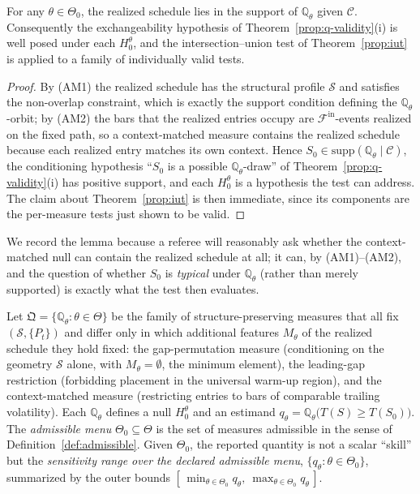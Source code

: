 \documentclass[risks,article,submit,pdftex,oneauthor]{Definitions/mdpi}
\begin{document}
\begin{Lemma}
\label{lem:admissible-validity}
For any $\theta\in\Theta_0$, the realized schedule lies in the support of
$\mathbb{Q}_\theta$ given $\mathcal C$. Consequently the exchangeability hypothesis
of Theorem~\ref{prop:q-validity}(i) is well posed under each $H_0^\theta$, and the
intersection--union test of Theorem~\ref{prop:iut} is applied to a family of
individually valid tests.
\end{Lemma}

\begin{proof}
By (AM1) the realized schedule has the structural profile $\mathcal S$ and satisfies
the non-overlap constraint, which is exactly the support condition defining the
$\mathbb{Q}_\theta$-orbit; by (AM2) the bars that the realized entries occupy are
$\mathcal F^{\mathrm{in}}$-events realized on the fixed path, so a context-matched
measure contains the realized schedule because each realized entry matches its own
context. Hence $S_0\in\mathrm{supp}(\mathbb{Q}_\theta\mid\mathcal C)$, the
conditioning hypothesis ``$S_0$ is a possible $\mathbb{Q}_\theta$-draw'' of
Theorem~\ref{prop:q-validity}(i) has positive support, and each $H_0^\theta$ is a
hypothesis the test can address. The claim about Theorem~\ref{prop:iut} is then
immediate, since its components are the per-measure tests just shown to be valid.
\end{proof}

We record the lemma because a referee will reasonably ask whether the
context-matched null can contain the realized schedule at all; it can, by (AM1)--(AM2),
and the question of whether $S_0$ is \emph{typical} under $\mathbb{Q}_\theta$ (rather
than merely supported) is exactly what the test then evaluates.

\begin{Definition}
\label{def:measure-family}
Let $\mathfrak Q=\{\mathbb{Q}_\theta:\theta\in\Theta\}$ be the family of
structure-preserving measures that all fix $(\mathcal S,\{P_t\})$ and differ only
in which additional features $M_\theta$ of the realized schedule they hold fixed:
the gap-permutation measure (conditioning on the geometry $\mathcal S$ alone, with
$M_\theta=\emptyset$, the minimum element), the leading-gap restriction (forbidding
placement in the universal warm-up region), and the context-matched measure
(restricting entries to bars of comparable trailing volatility). Each
$\mathbb{Q}_\theta$ defines a null $H_0^\theta$ and an estimand
$q_\theta=\mathbb{Q}_\theta\big(T(S)\ge T(S_0)\big)$. The \emph{admissible menu}
$\Theta_0\subseteq\Theta$ is the set of measures admissible in the sense of
Definition~\ref{def:admissible}. Given $\Theta_0$, the reported quantity is not a
scalar ``skill'' but the \emph{sensitivity range over the declared admissible
menu}, $\{q_\theta:\theta\in\Theta_0\}$, summarized by the outer bounds
$[\,\min_{\theta\in\Theta_0}q_\theta,\ \max_{\theta\in\Theta_0}q_\theta\,]$.
\end{Definition}
\end{document}
